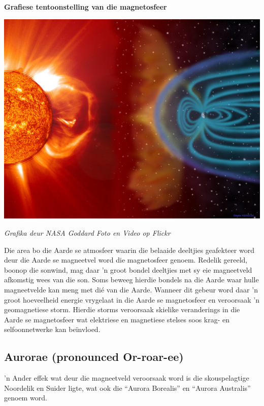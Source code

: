 \label{m37830*fs-id1166236522828}
\begin{minipage}{.5\textwidth}
 \begin{center}
  \textbf{Grafiese tentoonstelling van die magnetosfeer}\par
  \includegraphics[width=.8\textwidth]{photos/magnetosphere.jpg}\par
  \textit{Grafika deur NASA Goddard Foto en Video op Flickr}
 \end{center}
\end{minipage}
\begin{minipage}{.5\textwidth}

Die area bo die Aarde se atmosfeer waarin die belaaide deeltjies geafekteer word deur die Aarde se magneetvel word die magnetosfeer genoem. Redelik gereeld, boonop die sonwind, mag daar 'n groot bondel deeltjies met sy eie magneetveld afkomstig wees van die son. Soms beweeg hierdie bondels na die Aarde waar hulle magneetvelde kan meng met di\'e van die Aarde. Wanneer dit gebeur word daar 'n groot hoeveelheid energie vrygelaat in die Aarde se magnetosfeer en veroorsaak 'n geomagnetiese storm. Hierdie storms veroorsaak skielike veranderings in die Aarde se magnetosfeer wat elektriese en magnetiese stelses soos krag- en selfoonnetwerke kan be\"invloed.

\end{minipage}
\par 


\subsection{Aurorae (pronounced Or-roar-ee) }
\nopagebreak
\label{m37830*fs-id1166211416999}

'n Ander effek wat deur die magneetveld veroorsaak word is die skouspelagtige Noordelik en Suider ligte, wat ook die ``Aurora Borealis'' en ``Aurora Australis'' genoem word. \par

